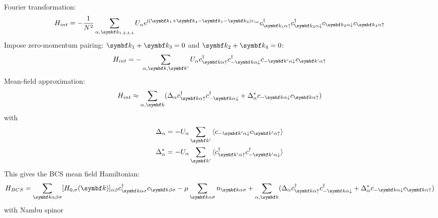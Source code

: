 \documentclass[../notes.tex]{subfiles}
\begin{document}
Fourier transformation:
\begin{equation}
	H_{int} = - \frac{1}{N^2} \sum_{\alpha, \vb{k}_{1, 2, 3, 4}} U_{\alpha} e^{\iu (\vb{k}_1 + \vb{k}_4 - \vb{k}_1 - \vb{k}_3) r_{i \alpha}}  c_{\vb{k}_1 \alpha \uparrow}^{\dagger} c_{\vb{k}_3 \alpha \downarrow}^{\dagger} c_{\vb{k}_2 \alpha \downarrow} c_{\vb{k}_4 \alpha \uparrow}
\end{equation}
Impose zero-momentum pairing: \(\vb{k}_1 + \vb{k}_3 = 0\) and \(\vb{k}_2 + \vb{k}_4 = 0\):
\begin{align}
	H_{int} = - \sum_{\alpha, \vb{k}, \vb{k}^{\prime}} U_{\alpha} c_{\vb{k} \alpha \uparrow}^{\dagger} c_{-\vb{k} \alpha \downarrow}^{\dagger} c_{-\vb{k}^{\prime} \alpha \downarrow} c_{\vb{k}^{\prime} \alpha \uparrow}
\end{align}
Mean-field approximation:
\begin{align}
	H_{int} \approx \sum_{\alpha, \vb{k}} (\Delta_{\alpha} c_{\vb{k} \alpha \uparrow}^{\dagger} c_{-\vb{k} \alpha \downarrow}^{\dagger} + \Delta_{\alpha}^* c_{-\vb{k} \alpha \downarrow} c_{\vb{k} \alpha \uparrow})
\end{align}
with
\begin{align}
	\Delta_{\alpha} &= - U_{\alpha} \sum_{\vb{k}^{\prime}} \braket{c_{-\vb{k}^{\prime} \alpha \downarrow} c_{\vb{k}^{\prime} \alpha \uparrow}} \\
	\Delta_{\alpha}^* &= - U_{\alpha} \sum_{\vb{k}^{\prime}} \braket{c_{\vb{k}^{\prime} \alpha \uparrow}^{\dagger} c_{-\vb{k}^{\prime} \alpha \downarrow}^{\dagger}}
\end{align}
This gives the BCS mean field Hamiltonian:
\begin{align}
	H_{BCS} = \sum_{\vb{k} \alpha \beta \sigma} [H_{0, \sigma} (\vb{k})]_{\alpha \beta} c_{\vb{k} \alpha \sigma}^{\dagger} c_{\vb{k} \beta \sigma}
	-\mu \sum_{\vb{k} \alpha \sigma} n_{\vb{k} \alpha \sigma}
	+ \sum_{\alpha, \vb{k}} (\Delta_{\alpha} c_{\vb{k} \alpha \uparrow}^{\dagger} c_{-\vb{k} \alpha \downarrow}^{\dagger} + \Delta_{\alpha}^* c_{-\vb{k} \alpha \downarrow} c_{\vb{k} \alpha \uparrow})
\end{align}
with Nambu spinor

\end{document}
